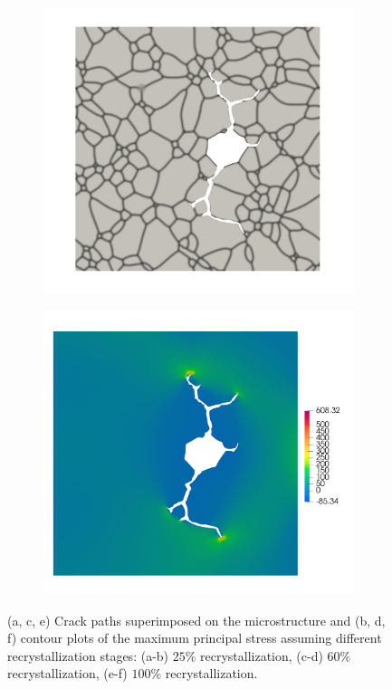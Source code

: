 \begin{figure}[htb!]
\begin{subfigure}[t]{0.4\linewidth}
    \caption{}
  \end{subfigure}\\
  \begin{subfigure}[t]{0.4\linewidth}
    \centering
    \includegraphics[width=\linewidth]{Chapter3/figures/partial_hbs_3}
    \caption{}
  \end{subfigure}
  \begin{subfigure}[t]{0.4\linewidth}
    \centering
    \includegraphics[width=\linewidth]{Chapter3/figures/partial_hbs_3_stress}
    \caption{}
  \end{subfigure}
  \caption[Crack propagation at different recrystallization stages.]{ (a, c, e) Crack paths superimposed on the microstructure and (b, d, f) contour plots of the maximum principal stress assuming different recrystallization stages: (a-b) $25\%$ recrystallization, (c-d) $60\%$ recrystallization, (e-f) $100\%$ recrystallization. }
  \label{fig:partial_hbs}
\end{figure}
